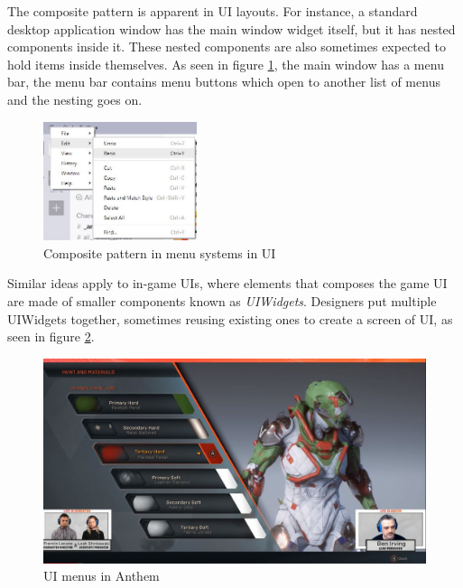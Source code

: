 \begin{multicols}{2}
The composite pattern is apparent in UI layouts. For instance, a standard desktop application window has the main window widget itself, but it has nested components inside it. These nested components are also sometimes expected to hold items inside themselves. As seen in figure \ref{fig:submenus}, the main window has a menu bar, the menu bar contains menu buttons which open to another list of menus and the nesting goes on.

\begin{figure}[H]
	\centering
	\includegraphics[width=0.4\textwidth]{assets/submenus}
	\caption{Composite pattern in menu systems in UI}
	\label{fig:submenus}
\end{figure}

Similar ideas apply to in-game UIs, where elements that composes the game UI are made of smaller components known as \textit{UIWidgets}. Designers put multiple UIWidgets together, sometimes reusing existing ones to create a screen of UI, as seen in figure \ref{fig:anthem-forge}.

\begin{figure}[H]
	\centering
	\includegraphics[width=\fullwidth]{assets/anthem-forge}
	\caption{UI menus in Anthem\cite{anthem-customization}}
	\label{fig:anthem-forge}
\end{figure}



\end{multicols}
